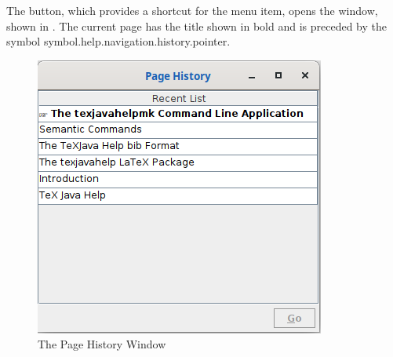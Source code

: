 \documentclass[toc=listof]{scrreport}
\begin{document}
The  button, 
which provides a shortcut for the
 menu item, opens the
 window,
shown in .
The current page has the title shown in bold and is preceded by
the symbol \gls{symbol.help.navigation.history.pointer}.

\begin{figure}
\centering
\includegraphics{images/historyframe}

\caption{The Page History Window}
\label{fig:historywindow}
\end{figure}




\printmain

\printindex
\end{document}
